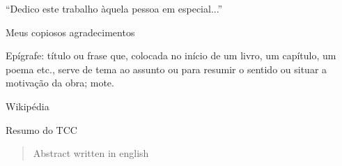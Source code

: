 \documentclass{ufpatcc}
\begin{document}
\ufpaPaginaDeRosto


\ufpaPagRostodo 

\ufpaPaginaDeAprovacao


\begin{ufpaOferecimento}

    “Dedico este trabalho àquela pessoa em especial...”

\end{ufpaOferecimento}


\begin{ufpaAgradecimentos}

    Meus copiosos agradecimentos

    
\end{ufpaAgradecimentos}


\begin{ufpaEpigrafe}
    Epígrafe: título ou frase que, colocada no início de um livro, um capítulo, um
    poema etc., serve de tema ao assunto ou para resumir o sentido ou situar a
    motivação da obra; mote.
    \begin{flushright}Wikipédia\end{flushright}
\end{ufpaEpigrafe}


\begin{ufpaResumo}

    Resumo do TCC

\end{ufpaResumo}

\begin{abstract}

    Abstract written in english

\end{abstract}


\end{document}
